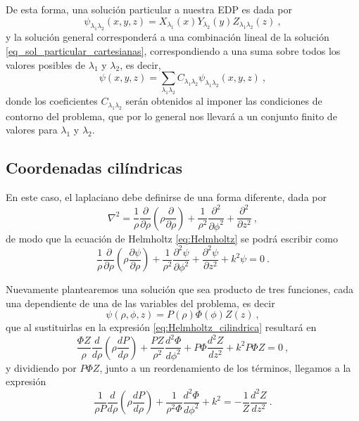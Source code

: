 De esta forma, una solución particular a nuestra EDP es dada por
\begin{equation} \label{eq:sol_particular_cartesianas}
    \psi_{\lambda_1 \lambda_2}(x,y,z) = X_{\lambda_1}(x) Y_{\lambda_2}(y) Z_{\lambda_1 \lambda_2}(z) \ ,
\end{equation}
y la solución general corresponderá a una combinación lineal de la solución \eqref{eq_sol_particular_cartesianas}, correspondiendo a una suma sobre todos los valores posibles de $\lambda_1$ y $\lambda_2$, es decir,
\begin{equation}
    \psi(x,y,z) = \sum_{\lambda_1 \lambda_2} C_{\lambda_1 \lambda_2} \psi_{\lambda_1 \lambda_2}(x,y,z) \ ,
\end{equation}
donde los coeficientes $C_{\lambda_1 \lambda_2}$ serán obtenidos al imponer las condiciones de contorno del problema, que por lo general nos llevará a un conjunto finito de valores para $\lambda_1$ y $\lambda_2$.

\newpage

\subsection{Coordenadas cilíndricas}

En este caso, el laplaciano debe definirse de una forma diferente, dada por
\begin{equation}
    \nabla^2 = \frac{1}{\rho} \frac{\partial}{\partial \rho} \left( \rho \frac{\partial}{\partial \rho} \right) + \frac{1}{\rho^2} \frac{\partial^2}{\partial \phi^2} + \frac{\partial^2}{\partial z^2} \ , 
\end{equation}
de modo que la ecuación de Helmholtz \eqref{eq:Helmholtz} se podrá escribir como
\begin{equation} \label{eq:Helmholtz_cilindrica}
    \frac{1}{\rho} \frac{\partial}{\partial \rho} \left( \rho \frac{\partial \psi}{\partial \rho} \right) + \frac{1}{\rho^2} \frac{\partial^2 \psi}{\partial \phi^2} + \frac{\partial^2 \psi}{\partial z^2} + k^2 \psi = 0 \ .
\end{equation}

Nuevamente plantearemos una solución que sea producto de tres funciones, cada una dependiente de una de las variables del problema, es decir
\begin{equation}
    \psi(\rho, \phi, z) = P(\rho) \Phi(\phi) Z(z) \ ,
\end{equation}
que al sustituirlas en la expresión \eqref{eq:Helmholtz_cilindrica} resultará en
\begin{equation}
    \frac{\Phi Z}{\rho} \frac{d}{d\rho}\left( \rho \frac{dP}{d\rho} \right) + \frac{PZ}{\rho^2} \frac{d^2 \Phi}{d\phi^2} + P\Phi \frac{d^2Z}{dz^2} + k^2 P\Phi Z = 0 \ ,
\end{equation}
y dividiendo por $P\Phi Z$, junto a un reordenamiento de los términos, llegamos a la expresión
\begin{equation}
    \frac{1}{\rho P} \frac{d}{d\rho} \left( \rho \frac{dP}{d\rho} \right) + \frac{1}{\rho^2 \Phi} \frac{d^2\Phi}{d\phi^2} + k^2 = - \frac{1}{Z} \frac{d^2Z}{dz^2} \ .
\end{equation}

